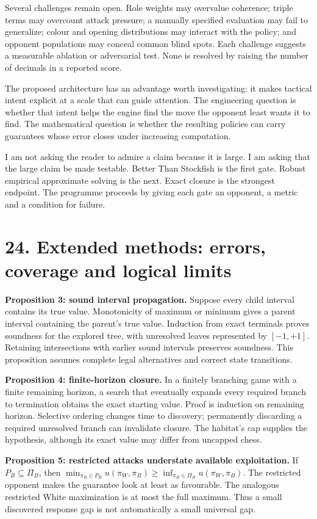 \documentclass[10pt]{article}
\begin{document}
Several challenges remain open. Role weights may overvalue coherence; triple terms may overcount attack pressure; a manually specified evaluation may fail to generalize; colour and opening distributions may interact with the policy; and opponent populations may conceal common blind spots. Each challenge suggests a measurable ablation or adversarial test. None is resolved by raising the number of decimals in a reported score.

The proposed architecture has an advantage worth investigating: it makes tactical intent explicit at a scale that can guide attention. The engineering question is whether that intent helps the engine find the move the opponent least wants it to find. The mathematical question is whether the resulting policies can carry guarantees whose error closes under increasing computation.

I am not asking the reader to admire a claim because it is large. I am asking that the large claim be made testable. Better Than Stockfish is the first gate. Robust empirical approximate solving is the next. Exact closure is the strongest endpoint. The programme proceeds by giving each gate an opponent, a metric and a condition for failure.

\clearpage
\section*{24. Extended methods: errors, coverage and logical limits}
\textbf{Proposition 3: sound interval propagation.} Suppose every child interval contains its true value. Monotonicity of maximum or minimum gives a parent interval containing the parent's true value. Induction from exact terminals proves soundness for the explored tree, with unresolved leaves represented by $[-1,+1]$. Retaining intersections with earlier sound intervals preserves soundness. This proposition assumes complete legal alternatives and correct state transitions.

\textbf{Proposition 4: finite-horizon closure.} In a finitely branching game with a finite remaining horizon, a search that eventually expands every required branch to termination obtains the exact starting value. Proof is induction on remaining horizon. Selective ordering changes time to discovery; permanently discarding a required unresolved branch can invalidate closure. The habitat's cap supplies the hypothesis, although its exact value may differ from uncapped chess.

\textbf{Proposition 5: restricted attacks understate available exploitation.} If $P_B\subseteq\Pi_B$, then $\min_{\pi_B\in P_B}u(\pi_W,\pi_B)\ge\inf_{\pi_B\in\Pi_B}u(\pi_W,\pi_B)$. The restricted opponent makes the guarantee look at least as favourable. The analogous restricted White maximization is at most the full maximum. Thus a small discovered response gap is not automatically a small universal gap.
\end{document}
